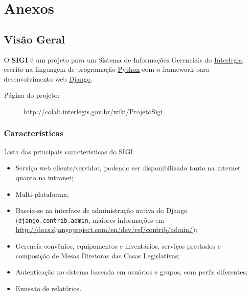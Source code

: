 %
%

\section{Anexos}
\label{sec:anexos}

\subsection{Visão Geral}
\label{sec:a2}
O \textbf{SIGI} é um projeto para um Sistema de Informações Gerenciais do
\href{http://www.interlegis.gov.br/}{Interlegis}, escrito na linguagem de
programação \href{http://www.python.org}{Python} com o framework para
desenvolvimento web \href{http://www.djangoproject.org}{Django}.
\begin{description}
\item[{Página do projeto}:] %

\href{http://colab.interlegis.gov.br/wiki/ProjetoSigi}{http://colab.interlegis.gov.br/wiki/ProjetoSigi}

\end{description}



\hypertarget{caracter-sticas}{}
\subsubsection*{Características}

Lista das principais características do SIGI:
\begin{itemize}
\item {} 
Serviço web cliente/servidor, podendo ser disponibilizado tanto na
internet quanto na intranet;

\item {} 
Multi-plataforma;

\item {} Baseia-se na interface de administração nativa do Django
  (\verb|django.contrib.admin|, maiores informações em
  \href{http://docs.djangoproject.com/en/dev/ref/contrib/admin/}{http://docs.djangoproject.com/en/dev/ref/contrib/admin/});

\item {} 
Gerencia convênios, equipamentos e inventários, serviços prestados e
composição de Mesas Diretoras das Casas Legislativas;

\item {} 
Autenticação no sistema baseada em usuários e grupos, com perfis
diferentes;

\item {} 
Emissão de relatórios.

\end{itemize}


